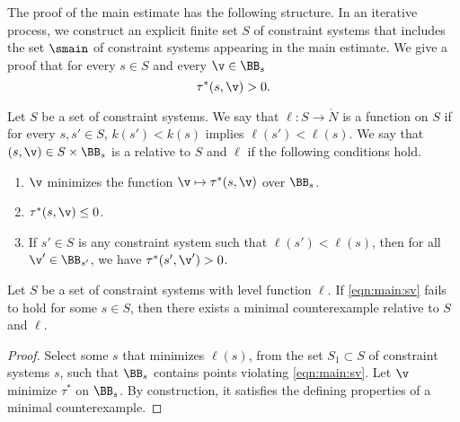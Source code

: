 The proof of the main estimate has the following structure.  In an
iterative process, we construct an explicit finite set $S$ of
constraint systems that includes the set $\smain$ of constraint
systems appearing in the main estimate.   We give a proof that for
every $s\in S$ and every $\v\in \BB_s$
\begin{equation}\label{eqn:main:sv}
\tau^*(s,\v)> 0.
\end{equation}

%
\begin{definition}
  Let $S$ be a set of constraint systems.  We say that $\ell:S\to\ring{N}$ 
  is a  function
on $S$ if for every $s,s'\in S$, $k(s')<k(s)$ implies  $\ell(s')<\ell(s)$. 
 We say that
  $(s,\v)\in S\times\BB_s$ is a   relative to $S$ and $\ell$ if
the following conditions hold.
\begin{enumerate}
\item $\v$ minimizes the function $\v\mapsto\tau^*(s,\v)$ over $\BB_s$.
\item  $\tau^*(s,\v)\le 0$.
\item If $s'\in S$ is any constraint system such that $\ell(s')<\ell(s)$, then
for all $\v'\in \BB_{s'}$, we have $\tau^*(s',\v')>0$.
\end{enumerate}
\end{definition}

\begin{lemma}
Let $S$ be a set of constraint systems with level function $\ell$.
If \eqref{eqn:main:sv} fails to hold for some $s\in S$, 
then there exists a minimal counterexample relative to $S$ and $\ell$.
\end{lemma}

\begin{proof}
  Select some $s$ that minimizes $\ell(s)$, from the set $S_1\subset S$ of
  constraint systems $s$, such that $\BB_s$ contains points violating
  \eqref{eqn:main:sv}.  Let $\v$ minimize $\tau^*$ on $\BB_s$.  By
  construction, it satisfies the  defining properties of a
  minimal counterexample.  
\end{proof}

